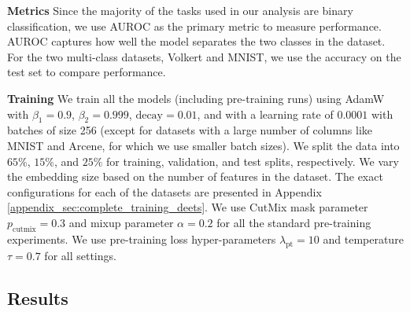 \documentclass{article}
\begin{document}
\textbf{Metrics} Since the majority of the tasks used in our analysis are binary classification, we use AUROC as the primary metric to measure performance. AUROC captures how well the model separates the two classes in the dataset. For the two multi-class datasets, Volkert and MNIST, we use the accuracy on the test set to compare performance.

\textbf{Training} We train all the models (including pre-training runs) using AdamW with $\beta_1 = 0.9$, $\beta_2 = 0.999$, $\text{decay} = 0.01$, and with a learning rate of $0.0001$ with batches of size 256 (except for datasets with a large number of columns like MNIST and Arcene, for which we use smaller batch sizes). We split the data into $65\%$, $15\%$, and $25\%$ for training, validation, and test splits, respectively. We vary the embedding size based on the number of features in the dataset. The exact configurations for each of the datasets are presented in Appendix \ref{appendix_sec:complete_training_deets}. We use CutMix mask parameter $p_{\text{cutmix}} = 0.3$ and mixup parameter $\alpha=0.2$ for all the standard pre-training experiments. We use pre-training loss hyper-parameters $\lambda_{\text{pt}} = 10$ and temperature $\tau = 0.7$ for all settings. 

\subsection{Results}
\label{subsec:main_results}
\end{document}
